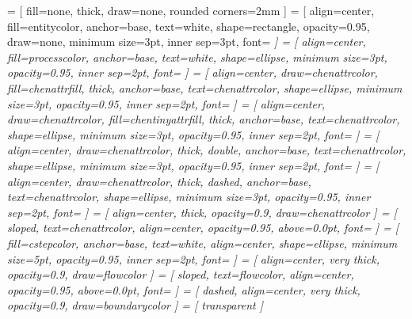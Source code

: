 \usepackage{pgf-umlcd}
\usepackage{tikz}
\usetikzlibrary{automata}
\usetikzlibrary{arrows}
\usetikzlibrary{backgrounds}
\usetikzlibrary{decorations.text}
\usetikzlibrary{decorations.markings}
\usetikzlibrary{fit}
\usetikzlibrary{graphs}
\usetikzlibrary{shapes.geometric}
     = [
      fill=none,
      thick,
      draw=none,
      rounded corners=2mm
    ]
     = [
      align=center,
      fill=entitycolor,
      anchor=base,
      text=white,
      shape=rectangle,
      opacity=0.95,
      draw=none,
      minimum size=3pt,
      inner sep=3pt,
      font=\sffamily\slshape\small
    ]
     = [
      align=center,
      fill=processcolor,
      anchor=base,
      text=white,
      shape=ellipse,
      minimum size=3pt,
      opacity=0.95,
      inner sep=2pt,
      font=\sffamily\small\slshape
    ]
     = [
      align=center,
      draw=chenattrcolor,
      fill=chenattrfill,
      thick,
      anchor=base,
      text=chenattrcolor,
      shape=ellipse,
      minimum size=3pt,
      opacity=0.95,
      inner sep=2pt,
      font=\ttfamily\small
    ]
     = [
      align=center,
      draw=chenattrcolor,
      fill=chentinyattrfill,
      thick,
      anchor=base,
      text=chenattrcolor,
      shape=ellipse,
      minimum size=3pt,
      opacity=0.95,
      inner sep=2pt,
      font=\ttfamily\footnotesize
    ]
     = [
      align=center,
      draw=chenattrcolor,
      thick,
      double,
      anchor=base,
      text=chenattrcolor,
      shape=ellipse,
      minimum size=3pt,
      opacity=0.95,
      inner sep=2pt,
      font=\ttfamily\small
    ]
     = [
      align=center,
      draw=chenattrcolor,
      thick,
      dashed,
      anchor=base,
      text=chenattrcolor,
      shape=ellipse,
      minimum size=3pt,
      opacity=0.95,
      inner sep=2pt,
      font=\ttfamily\small
    ]
     = [
      align=center,
      thick,
      opacity=0.9,
      draw=chenattrcolor
    ]
     = [
      sloped,
      text=chenattrcolor,
      align=center,
      opacity=0.95,
      above=0.0pt,
      font=\ttfamily\small
    ]
     = [
      fill=cstepcolor,
      anchor=base,
      text=white,
      align=center,
      shape=ellipse,
      minimum size=5pt,
      opacity=0.95,
      inner sep=2pt,
      font=\sffamily\scriptsize\itshape
    ]
     = [
      align=center,
      very thick,
      opacity=0.9,
      draw=flowcolor
    ]
     = [
      sloped,
      text=flowcolor,
      align=center,
      opacity=0.95,
      above=0.0pt,
      font=\sffamily\footnotesize\slshape
    ]
     = [
      dashed,
      align=center,
      very thick,
      opacity=0.9,
      draw=boundarycolor
    ]
     = [
      transparent
    ]


